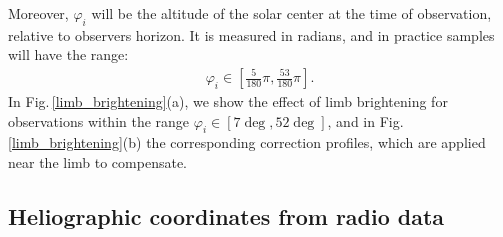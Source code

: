 \documentclass{aa}
\newcommand{\eqnl}[2]{\begin{eqnarray}\label{#1}#2\end{eqnarray}}
\begin{document}
Moreover, $\varphi_i$ will be the altitude of the solar center at the time of observation, relative 
to observers horizon. It is measured in radians, and in practice samples will have the range:
\eqnl{altitude_range}{
\varphi_i \in \left[ \frac{5}{180} \pi, \frac{53}{180} \pi \right] \text{.}
}
In Fig.\,\ref{limb_brightening}(a), we show the effect of limb brightening for
observations within the range $\varphi_i\in[7\deg,52\deg]$, and in
Fig.\,\ref{limb_brightening}(b) the corresponding correction profiles, which 
are applied near the limb to compensate.

%
%
%

\subsection{Heliographic coordinates from radio data}\label{sect:helio}
\end{document}
